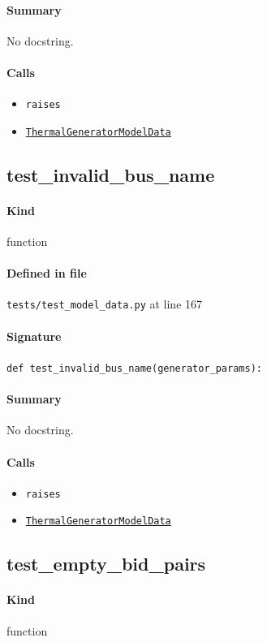 \documentclass[11pt]{report}
\begin{document}
\paragraph{Summary} No docstring.
\paragraph{Calls}
\begin{itemize}[leftmargin=*]
  \item \texttt{raises}
  \item \hyperref[def:model_data.py:ThermalGeneratorModelData:L185]{\texttt{ThermalGeneratorModelData}}
\end{itemize}
\subsection{test\_invalid\_bus\_name}
\label{def:tests-test_model_data.py:test_invalid_bus_name:L167}
\paragraph{Kind} function
\paragraph{Defined in file} \texttt{tests/test\_model\_data.py} at line 167
\paragraph{Signature} \texttt{def test\_invalid\_bus\_name(generator\_params):}
\paragraph{Summary} No docstring.
\paragraph{Calls}
\begin{itemize}[leftmargin=*]
  \item \texttt{raises}
  \item \hyperref[def:model_data.py:ThermalGeneratorModelData:L185]{\texttt{ThermalGeneratorModelData}}
\end{itemize}
\subsection{test\_empty\_bid\_pairs}
\label{def:tests-test_model_data.py:test_empty_bid_pairs:L177}
\paragraph{Kind} function
\end{document}
